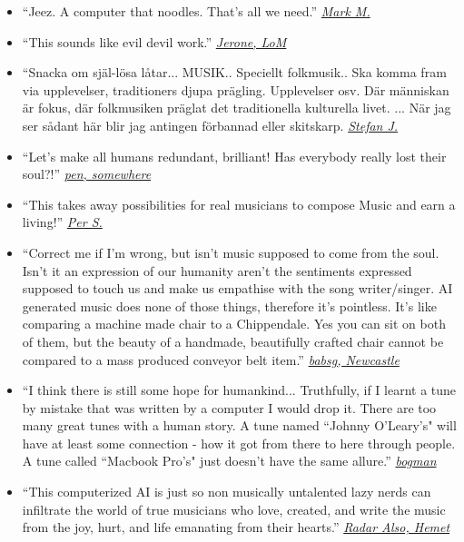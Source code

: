 \documentclass[a4paper,notitlepage,twoside]{book}
\begin{document}
\begin{itemize}
\item ``Jeez. A computer that noodles. That’s all we need.'' \href{https://thesession.org/discussions/37800}{{\em Mark M.}}
\item ``This sounds like evil devil work.'' \href{https://thesession.org/discussions/37800}{{\em Jerone, LoM}}
\item ``Snacka om själ-lösa låtar... MUSIK.. Speciellt folkmusik.. Ska komma fram via upplevelser, traditioners djupa prägling. Upplevelser osv. Där människan är fokus, där folkmusiken präglat det traditionella kulturella livet. ... När jag ser sådant här blir jag antingen förbannad eller skitskarp. \href{https://www.facebook.com/groups/svenskfolkmusik/permalink/10156536106241145/}{{\em Stefan J.}}
\item ``Let's make all humans redundant, brilliant! Has everybody really lost their soul?!'' \href{https://www.dailymail.co.uk/sciencetech/article-4544400/Researchers-create-computer-writes-folk-music.html#comments}{{\em pen, somewhere}}
\item ``This takes away possibilities for real musicians to compose Music and earn a living!'' \href{https://www.facebook.com/groups/svenskfolkmusik/permalink/10156536106241145/}{{\em Per S.}}
\item ``Correct me if I'm wrong, but isn't music supposed to come from the soul. Isn't it an expression of our humanity aren't the sentiments expressed supposed to touch us and make us empathise with the song writer/singer. AI generated music does none of those things, therefore it's pointless. It's like comparing a machine made chair to a Chippendale. Yes you can sit on both of them, but the beauty of a handmade, beautifully crafted chair cannot be compared to a mass produced conveyor belt item.'' \href{https://www.dailymail.co.uk/sciencetech/article-4544400/Researchers-create-computer-writes-folk-music.html#comments}{{\em babsg, Newcastle}}
\item ``I think there is still some hope for humankind... Truthfully, if I learnt a tune by mistake that was written by a computer I would drop it. There are too many great tunes with a human story. A tune named ``Johnny O’Leary’s" will have at least some connection - how it got from there to here through people. A tune called ``Macbook Pro’s" just doesn’t have the same allure.'' \href{https://thesession.org/discussions/42458}{{\em bogman}}
\item ``This computerized AI is just so non musically untalented lazy nerds can infiltrate the world of true musicians who love, created, and write the music from the joy, hurt, and life emanating from their hearts.'' \href{https://www.dailymail.co.uk/sciencetech/article-4544400/Researchers-create-computer-writes-folk-music.html#comments}{{\em Radar Also, Hemet}}

\end{itemize}
\end{document}
